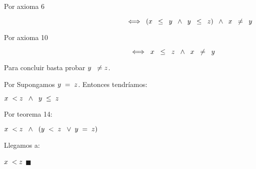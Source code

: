 \documentclass[12pt]{article}
\renewcommand{\qedsymbol}{$\blacksquare$}
\begin{document}
Por axioma 6
\begin{center}
$\hspace{6.5cm}\Longleftrightarrow\hspace{0.2cm} (x\hspace{0.2cm}\leq\hspace{0.2cm}y\hspace{0.2cm} \wedge\hspace{0.2cm} y \hspace{0.2cm} \leq \hspace{0.2cm} z)\hspace{0.2cm}\wedge\hspace{0.2cm} x\hspace{0.2cm}\neq\hspace{0.2cm}y$ 
\end{center}\vspace{0.2cm}

Por axioma 10
\begin{center}
$\hspace{6.5cm}\Longleftrightarrow\hspace{0.2cm} x\hspace{0.2cm}\leq\hspace{0.2cm}z\hspace{0.2cm}\wedge\hspace{0.2cm} x \hspace{0.2cm} \neq \hspace{0.2cm} y$ 
\end{center}\vspace{0.2cm}

Para concluir basta probar $y\hspace{0.2cm} \neq z$. \vspace{0.4cm}

Por {} Supongamos $y\hspace{0.1cm}=\hspace{0.1cm} z$. Entonces tendríamos:

\begin{center}
    $x\hspace{0.1cm}<z\hspace{0.2cm} \wedge \hspace{0.2cm} y\hspace{0.1cm} \leq \hspace{0.1cm} z$
\end{center}\vspace{0.2cm}

Por teorema 14:
\begin{center}
    $x\hspace{0.1cm}<z\hspace{0.2cm} \wedge \hspace{0.2cm} (y\hspace{0.1cm} < \hspace{0.1cm} z\hspace{0.2cm} \vee \hspace{0.1cm}y\hspace{0.1cm} = \hspace{0.1cm} z)$
\end{center}
Llegamos a:
\begin{center}
    $x\hspace{0.1cm}<z$ \hspace{02cm}\qedsymbol
\end{center}
\end{document}
